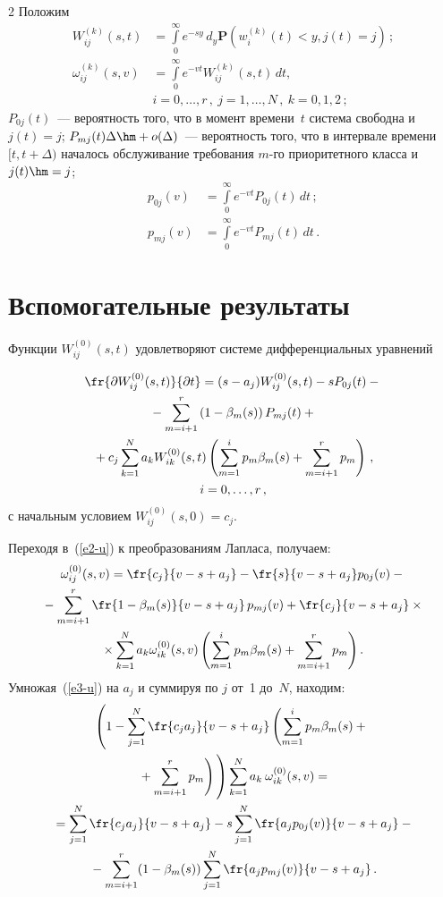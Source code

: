 \begin{multicols}{2}
Положим
\begin{align*}
W_{ij}^{(k)}(s,t)&=\int\limits_0^{\infty}e^{-sy}\,d_y\mathbf{P}(w_i^{(k)}(t)<y,j(t)=j)\,;
\\
\omega_{ij}^{(k)}(s,v)&=\int\limits_0^{\infty}e^{-vt}
W_{ij}^{(k)}(s,t)\,dt,\\\
&i=0,\ldots,r\,,\ j=1,\ldots,N\,,\ k=0,1,2\,;
\end{align*}
$P_{0j}(t)$~--- вероятность того, что в момент времени~$t$ система 
свободна и $j(t)=j$; $P_{mj}(t) \Delta\hm+o(\Delta)$~--- вероятность того, что в
интервале времени $[t,t+\Delta)$ началось обслуживание требования $m$-го приоритетного 
класса и $j(t)\hm=j$;
\begin{align*}
p_{0j}(v)&=\int\limits_0^{\infty}e^{-vt}P_{0j}(t)\,dt\,;\\
p_{mj}(v)&=\int\limits_0^{\infty}e^{-vt}P_{mj}(t)\,dt\,.
\end{align*}


\section{Вспомогательные результаты}

Функции $W_{ij}^{(0)}(s,t)$ удовлетворяют системе дифференциальных уравнений

\noindent
\begin{multline}
\label{e2-u}
\fr{\partial W_{ij}^{(0)}(s,t)}{\partial t}=(s-a_j) W_{ij}^{(0)}(s,t)-s P_{0j}(t)-{}\\
{}-
\sum\limits_{m=i+1}^r\left(1-\beta_m(s)\right) P_{mj}(t)+{}\\
{}+c_j \sum\limits_{k=1}^N a_k  W_{ik}^{(0)}(s,t) 
\left(\sum\limits_{m=1}^ip_m\beta_m(s)+\sum\limits_{m=i+1}^rp_m\right)\,,\\
i=0,\ldots,r\,,
\end{multline}
с начальным условием $W_{ij}^{(0)}(s,0)=c_j$.

Переходя в~(\ref{e2-u}) к преобразованиям Лапласа, получаем:
\begin{multline}
\label{e3-u}
\omega_{ij}^{(0)}(s,v)=\fr{c_j}{v-s+a_j}-\fr{s}{v-s+a_j} p_{0j}(v)-{}\\
{}-\sum\limits_{m=i+1}^r
\fr{1-\beta_m(s)}{v-s+a_j}\, p_{mj}(v)+\fr{c_j}{v-s+a_j}\times{}\\
\!\!{}\times
\sum\limits_{k=1}^N a_k \omega_{ik}^{(0)}(s,v)
\left(\sum\limits_{m=1}^ip_m\beta_m(s)+\sum\limits_{m=i+1}^rp_m\right).\!
\end{multline}
Умножая~(\ref{e3-u}) на $a_j$ и суммируя по $j$ от~1 до~$N$, находим:
\begin{multline}
\label{e4-u}
\left(1-\sum\limits_{j=1}^N\fr{c_ja_j}{v-s+a_j}\left(\sum\limits_{m=1}^ip_m\beta_m(s)+{}\right.\right.\\
\left.\left.{}+
\sum\limits_{m=i+1}^rp_m\right)\vphantom{\sum\limits_{j=1}^N}\right)
\sum\limits_{k=1}^N a_k\: \omega_{ik}^{(0)}(s,v)={}\\
{}= \sum\limits_{j=1}^N\fr{c_ja_j}{v-s+a_j}-s\sum\limits_{j=1}^N\fr{a_jp_{0j}(v)}{v-s+a_j}-{}\\
{}-
\sum\limits_{m=i+1}^r (1-\beta_m(s))\sum\limits_{j=1}^N\fr{a_jp_{mj}(v)}{v-s+a_j}\,.
\end{multline}


\end{multicols}
